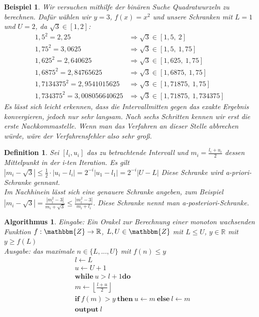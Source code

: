 \documentclass[12pt]{article}
\newcommand{\Z}{\mathbbm{Z}} %
\newcommand{\R}{\mathbb{R}} %
\newtheorem{definition}[satz]{Definition}
\newtheorem{beispiel}[satz]{Beispiel}
\newtheorem{algorithmus}[satz]{Algorithmus}
\begin{document}
\begin{beispiel}
   Wir versuchen mithilfe der binären Suche Quadratwurzeln zu berechnen. Dafür wählen wir $y=3$, $f(x)=x^2$ und unsere Schranken mit $L=1$ und $U=2$, da $\sqrt{3} \in [1,2]$: \\ 
   \begin{align*}
       1,5^2=2,25 &\Rightarrow \sqrt{3} \in [1,5,\: 2] \\
       1,75^2=3,0625 &\Rightarrow \sqrt{3} \in [1,5, \: 1,75] \\ 
       1,625^2=2,640625 &\Rightarrow \sqrt{3} \in [1,625, \: 1,75] \\
       1,6875^2=2,84765625 &\Rightarrow \sqrt{3} \in [1,6875, \: 1,75] \\
       1,7134375^2=2,9541015625 &\Rightarrow \sqrt{3} \in [1,71875, \: 1,75] \\
       1,734375^2=3,008056640625 &\Rightarrow \sqrt{3} \in [1,71875, \: 1,734375]
   \end{align*}
   Es lässt sich leicht erkennen, dass die Intervallmitten gegen das exakte Ergebnis konvergieren, jedoch nur sehr langsam. Nach sechs Schritten kennen wir erst die erste Nachkommastelle. Wenn man das Verfahren an dieser Stelle abbrechen würde, wäre der Verfahrensfehler also sehr groß.
   \label{binäre suche}
\end{beispiel}

\begin{definition}
    Sei $[l_i,u_i]$ das zu betrachtende Intervall und $m_i= \frac{l_i+u_i}{2}$ dessen Mittelpunkt in der i-ten Iteration. 
    Es gilt $|m_i-\sqrt{3}|\leq \frac{1}{2} \cdot|u_i-l_i|=2^{-i}|u_1-l_1|= 2^{-i}|U-L|$
    Diese Schranke wird a-priori-Schranke gennant. \\
    Im Nachhinein lässt sich eine genauere Schranke angeben, zum Beispiel $|m_i-\sqrt{3}|=\frac{|m_i^2-3|}{m_i+ \sqrt{3}}\leq \frac{|m_i^2-3|}{m_i+l_i}$. Diese Schranke nennt man a-posteriori-Schranke. 
\end{definition}

\begin{algorithmus}
    Eingabe: Ein Orakel zur Berechnung einer monoton wachsenden Funktion $f: \Z \to \R$, $L,U \in \Z$ mit $L\leq U$, $y \in \R$ mit $y \geq f(L)$ \\ 
    Ausgabe: das maximale $n \in \{L,...,U\}$ mit $f(n) \leq y$ 
    \begin{align*}
        &l \leftarrow L \\ 
       &u  \leftarrow  U+1 \\
       &\textbf{while} \: u>l+1 \textbf{do} \\
       &m \leftarrow \left \lfloor \frac{l+u}{2} \right \rfloor \\
       & \textbf{if} \: f(m) > y \: \textbf{then} \: u \leftarrow m \: \textbf{else} \: l \leftarrow m \\ 
       & \textbf{output} \: l
    \end{align*}
    \label{binäre suche}
\end{algorithmus}
\end{document}
